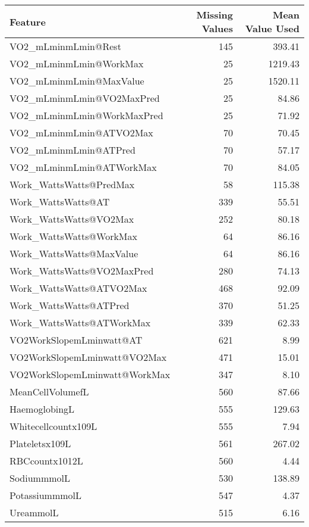 \documentclass{article}
\begin{document}
\begin{table}[H]
    \centering
    \small
    \begin{tabular}{lrr}
    \toprule
    \textbf{Feature} & \textbf{Missing Values} & \textbf{Mean Value Used} \\
    \midrule
    VO2\_mLminmLmin@Rest & 145 & 393.41 \\
    VO2\_mLminmLmin@WorkMax & 25 & 1219.43 \\
    VO2\_mLminmLmin@MaxValue & 25 & 1520.11 \\
    VO2\_mLminmLmin@VO2MaxPred & 25 & 84.86 \\
    VO2\_mLminmLmin@WorkMaxPred & 25 & 71.92 \\
    VO2\_mLminmLmin@ATVO2Max & 70 & 70.45 \\
    VO2\_mLminmLmin@ATPred & 70 & 57.17 \\
    VO2\_mLminmLmin@ATWorkMax & 70 & 84.05 \\
    Work\_WattsWatts@PredMax & 58 & 115.38 \\
    Work\_WattsWatts@AT & 339 & 55.51 \\
    Work\_WattsWatts@VO2Max & 252 & 80.18 \\
    Work\_WattsWatts@WorkMax & 64 & 86.16 \\
    Work\_WattsWatts@MaxValue & 64 & 86.16 \\
    Work\_WattsWatts@VO2MaxPred & 280 & 74.13 \\
    Work\_WattsWatts@ATVO2Max & 468 & 92.09 \\
    Work\_WattsWatts@ATPred & 370 & 51.25 \\
    Work\_WattsWatts@ATWorkMax & 339 & 62.33 \\
    VO2WorkSlopemLminwatt@AT & 621 & 8.99 \\
    VO2WorkSlopemLminwatt@VO2Max & 471 & 15.01 \\
    VO2WorkSlopemLminwatt@WorkMax & 347 & 8.10 \\
    MeanCellVolumefL & 560 & 87.66 \\
    HaemoglobingL & 555 & 129.63 \\
    Whitecellcountx109L & 555 & 7.94 \\
    Plateletsx109L & 561 & 267.02 \\
    RBCcountx1012L & 560 & 4.44 \\
    SodiummmolL & 530 & 138.89 \\
    PotassiummmolL & 547 & 4.37 \\
    UreammolL & 515 & 6.16 \\

\end{tabular}
\end{table}
\end{document}
